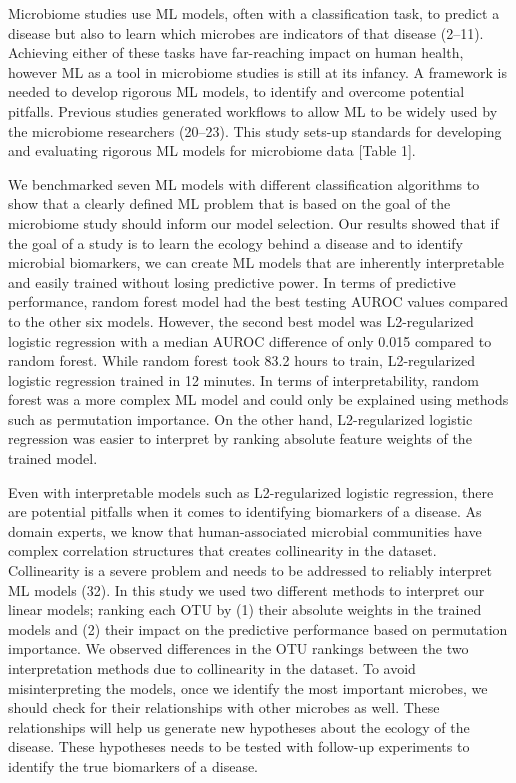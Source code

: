 \documentclass[11pt,]{article}
\begin{document}
Microbiome studies use ML models, often with a classification task, to
predict a disease but also to learn which microbes are indicators of
that disease (2--11). Achieving either of these tasks have far-reaching
impact on human health, however ML as a tool in microbiome studies is
still at its infancy. A framework is needed to develop rigorous ML
models, to identify and overcome potential pitfalls. Previous studies
generated workflows to allow ML to be widely used by the microbiome
researchers (20--23). This study sets-up standards for developing and
evaluating rigorous ML models for microbiome data {[}Table 1{]}.

We benchmarked seven ML models with different classification algorithms
to show that a clearly defined ML problem that is based on the goal of
the microbiome study should inform our model selection. Our results
showed that if the goal of a study is to learn the ecology behind a
disease and to identify microbial biomarkers, we can create ML models
that are inherently interpretable and easily trained without losing
predictive power. In terms of predictive performance, random forest
model had the best testing AUROC values compared to the other six
models. However, the second best model was L2-regularized logistic
regression with a median AUROC difference of only 0.015 compared to
random forest. While random forest took 83.2 hours to train,
L2-regularized logistic regression trained in 12 minutes. In terms of
interpretability, random forest was a more complex ML model and could
only be explained using methods such as permutation importance. On the
other hand, L2-regularized logistic regression was easier to interpret
by ranking absolute feature weights of the trained model.

Even with interpretable models such as L2-regularized logistic
regression, there are potential pitfalls when it comes to identifying
biomarkers of a disease. As domain experts, we know that
human-associated microbial communities have complex correlation
structures that creates collinearity in the dataset. Collinearity is a
severe problem and needs to be addressed to reliably interpret ML models
(32). In this study we used two different methods to interpret our
linear models; ranking each OTU by (1) their absolute weights in the
trained models and (2) their impact on the predictive performance based
on permutation importance. We observed differences in the OTU rankings
between the two interpretation methods due to collinearity in the
dataset. To avoid misinterpreting the models, once we identify the most
important microbes, we should check for their relationships with other
microbes as well. These relationships will help us generate new
hypotheses about the ecology of the disease. These hypotheses needs to
be tested with follow-up experiments to identify the true biomarkers of
a disease.
\end{document}
